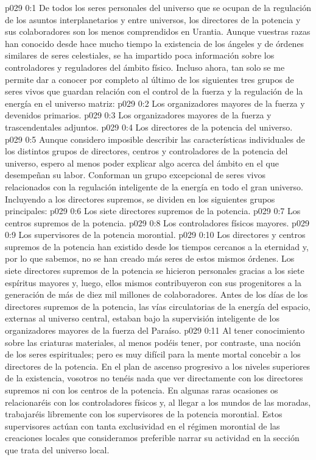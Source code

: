 \author{Censor universal}
\vs p029 0:1 De todos los seres personales del universo que se ocupan de la regulación de los asuntos interplanetarios y entre universos, los directores de la potencia y sus colaboradores son los menos comprendidos en Urantia. Aunque vuestras razas han conocido desde hace mucho tiempo la existencia de los ángeles y de órdenes similares de seres celestiales, se ha impartido poca información sobre los controladores y reguladores del ámbito físico. Incluso ahora, tan solo se me permite dar a conocer por completo al último de los siguientes tres grupos de seres vivos que guardan relación con el control de la fuerza y la regulación de la energía en el universo matriz:
\vs p029 0:2 Los organizadores mayores de la fuerza y devenidos primarios.
\vs p029 0:3 Los organizadores mayores de la fuerza y trascendentales adjuntos.
\vs p029 0:4 Los directores de la potencia del universo.
\vs p029 0:5 \pc Aunque considero imposible describir las características individuales de los distintos grupos de directores, centros y controladores de la potencia del universo, espero al menos poder explicar algo acerca del ámbito en el que desempeñan su labor. Conforman un grupo excepcional de seres vivos relacionados con la regulación inteligente de la energía en todo el gran universo. Incluyendo a los directores supremos, se dividen en los siguientes grupos principales:
\vs p029 0:6 Los siete directores supremos de la potencia.
\vs p029 0:7 Los centros supremos de la potencia.
\vs p029 0:8 Los controladores físicos mayores.
\vs p029 0:9 Los supervisores de la potencia morontial.
\vs p029 0:10 \pc Los directores y centros supremos de la potencia han existido desde los tiempos cercanos a la eternidad y, por lo que sabemos, no se han creado más seres de estos mismos órdenes. Los siete directores supremos de la potencia se hicieron personales gracias a los siete espíritus mayores y, luego, ellos mismos contribuyeron con sus progenitores a la generación de más de diez mil millones de colaboradores. Antes de los días de los directores supremos de la potencia, las vías circulatorias de la energía del espacio, externas al universo central, estaban bajo la supervisión inteligente de los organizadores mayores de la fuerza del Paraíso.
\vs p029 0:11 Al tener conocimiento sobre las criaturas materiales, al menos podéis tener, por contraste, una noción de los seres espirituales; pero es muy difícil para la mente mortal concebir a los directores de la potencia. En el plan de ascenso progresivo a los niveles superiores de la existencia, vosotros no tenéis nada que ver directamente con los directores supremos ni con los centros de la potencia. En algunas raras ocasiones os relacionaréis con los controladores físicos y, al llegar a los mundos de las moradas, trabajaréis libremente con los supervisores de la potencia morontial. Estos supervisores actúan con tanta exclusividad en el régimen morontial de las creaciones locales que consideramos preferible narrar su actividad en la sección que trata del universo local.

